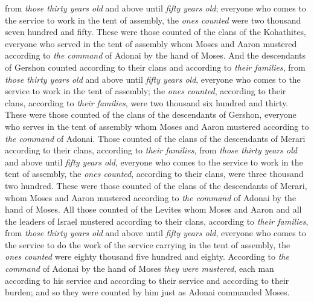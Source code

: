 \begin{biblechapter}
\verse from \textit{those thirty years old} and above until \textit{fifty years old}; everyone who comes to the service to work in the tent of assembly,
\verse the \textit{ones counted} were two thousand seven hundred and fifty.
\verse These were those counted of the clans of the Kohathites, everyone who served in the tent of assembly whom Moses and Aaron mustered according to \textit{the command} of Adonai by the hand of Moses.
\verse And the descendants of Gershon counted according to their clans and according to \textit{their families},
\verse from \textit{those thirty years old} and above until \textit{fifty years old}, everyone who comes to the service to work in the tent of assembly;
\verse the \textit{ones counted}, according to their clans, according to \textit{their families}, were two thousand six hundred and thirty.
\verse These were those counted of the clans of the descendants of Gershon, everyone who serves in the tent of assembly whom Moses and Aaron mustered according to \textit{the command} of Adonai.
\verse Those counted of the clans of the descendants of Merari according to their clans, according to \textit{their families},
\verse from \textit{those thirty years old} and above until \textit{fifty years old}, everyone who comes to the service to work in the tent of assembly,
\verse the \textit{ones counted}, according to their clans, were three thousand two hundred.
\verse These were those counted of the clans of the descendants of Merari, whom Moses and Aaron mustered according to \textit{the command} of Adonai by the hand of Moses.
\verse All those counted of the Levites whom Moses and Aaron and all the leaders of Israel mustered according to their clans, according to \textit{their families},
\verse from \textit{those thirty years old} and above until \textit{fifty years old}, everyone who comes to the service to do the work of the service carrying in the tent of assembly,
\verse the \textit{ones counted} were eighty thousand five hundred and eighty.
\verse According to \textit{the command} of Adonai by the hand of Moses \textit{they were mustered}, each man according to his service and according to their service and according to their burden; and so they were counted by him just as Adonai commanded Moses.
\end{biblechapter}

